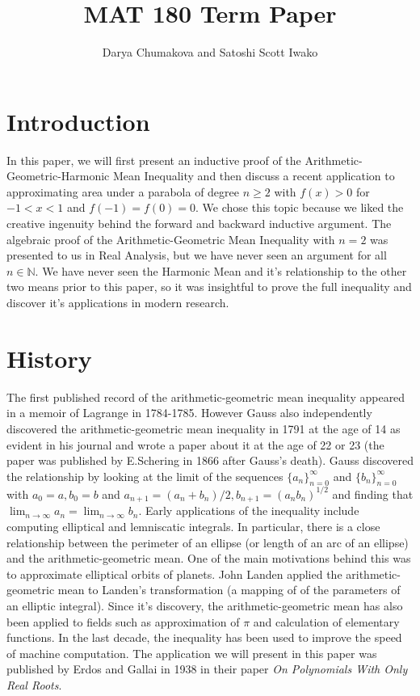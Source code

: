 \documentclass[12pt]{extreport}
\begin{document}
\title{MAT 180 Term Paper}
\author{Darya Chumakova and Satoshi Scott Iwako}
\maketitle

\section*{Introduction}
In this paper, we will first present an inductive proof of the Arithmetic-Geometric-Harmonic Mean Inequality and then discuss a recent application to approximating area under a parabola of degree $n \geq 2$ with $f(x) > 0$ for $-1 < x < 1$ and $f(-1) = f(0) = 0$. We chose this topic because we liked the creative ingenuity behind the forward and backward inductive argument. The algebraic proof of the Arithmetic-Geometric Mean Inequality with $n = 2$ was presented to us in Real Analysis, but we have never seen an argument for all $n \in \mathbb{N}$. We have never seen the Harmonic Mean and it's relationship to the other two means prior to this paper, so it was insightful to prove the full inequality and discover it's applications in modern research. 
\section*{History}
The first published record of the arithmetic-geometric mean inequality appeared in a memoir of Lagrange in 1784-1785. However Gauss also independently discovered the arithmetic-geometric mean inequality in 1791 at the age of 14 as evident in his journal and wrote a paper about it at the age of 22 or 23 (the paper was published by E.Schering in 1866 after Gauss's death). Gauss discovered the relationship by looking at the limit of the sequences $\{a_n\}_{n = 0}^{\infty}$ and $\{b_n\}_{n = 0}^{\infty}$ with $a_0 = a, b_0 = b$ and $a_{n+1} = (a_n + b_n)/2, b_{n+1} = (a_nb_n)^{1/2}$ and finding that $\lim_{n\to\infty} a_n = \lim_{n\to\infty} b_n$. Early applications of the inequality include computing elliptical and lemniscatic integrals. In particular, there is a close relationship between the perimeter of an ellipse (or length of an arc of an ellipse) and the arithmetic-geometric mean. One of the main motivations behind this was to approximate elliptical orbits of planets. John Landen applied the arithmetic-geometric mean to Landen's transformation (a mapping of of the parameters of an elliptic integral). Since it's discovery, the arithmetic-geometric mean has also been applied to fields such as approximation of $\pi$ and calculation of elementary functions. In the last decade, the inequality has been used to improve the speed of machine computation. The application we will present in this paper was published by Erdos and Gallai in 1938 in their paper \textit{On Polynomials With Only Real Roots}.
\end{document}
